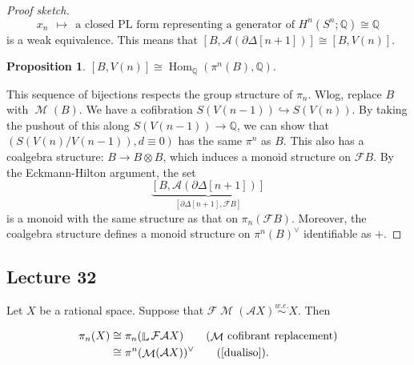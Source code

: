\documentclass[10pt,letterpaper,cm]{nupset}
\theoremstyle{definition}
\theoremstyle{theorem}
\newtheorem{prop}[defn]{Proposition}
\theoremstyle{remark}
\newcommand{\A}{\mathcal A}
\newcommand{\F}{\mathcal F}
\DeclareMathOperator{\Ll}{\mathbb L}
\newcommand{\Q}{\mathbb Q}
\newcommand{\1}{\mathbb{1}}
\newcommand{\0}{\vec 0}
\DeclareMathOperator{\M}{\mathcal{M}}
\DeclareMathOperator{\Hom}{Hom}
\begin{document}
\begin{proof}[Proof sketch]
\[
x_n \ \ \mapsto \ \ \text{a closed PL form representing a generator of $H^n(S^n;\Q) \cong \Q$}
\] is a weak equivalence. This means that $ \left[B, \A(\partial{\Delta\left[n+1\right]})\right] \cong  \left[B, V(n)\right]$.

\begin{prop}
$\left[B, V(n)\right] \cong \Hom_{\Q}(\pi^n(B), \Q)$.
\end{prop}

This sequence of bijections respects the group structure of $\pi_n$. Wlog, replace $B$ with $\M(B)$. We have a cofibration $S(V(n-1)) \hookrightarrow S(V(n))$. By taking the pushout of this along $S(V(n-1)) \to \Q$,  we can show that $\left(S(V(n)/V(n-1)), d \equiv 0\right)$ has the same $\pi^n$ as $B$.  This also has a coalgebra structure: $B \to B \otimes B$, which induces a monoid structure on $\F{B}$. By the Eckmann-Hilton argument, the set
\[
\underbrace{\left[B, \A(\partial{\Delta\left[n+1\right]})\right]}_{\left[\partial{\Delta\left[n+1\right]}, \F{B}\right]}
\] is a monoid with the same structure as that on $\pi_n(\F{B})$. Moreover, the coalgebra structure defines a monoid structure on $\pi^n(B)^{\vee}$ identifiable as $+$.

\end{proof}

\subsection{Lecture 32}

Let $X$ be a rational space. Suppose that $\F{\M{(\A{X})}} \overset{\textit{w.e.}}{\sim} X$. Then

\begin{align*}
\pi_n(X) &  \cong \pi_n(\Ll{\F{\A{X}}}) \tag{$\M$ cofibrant replacement}
\\  & \cong \pi^n(\M(\A{X}))^{\vee}   \tag{\cref{dualiso}}.
\end{align*}
\end{document}
